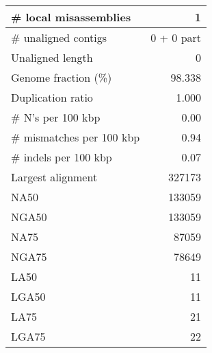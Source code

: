 \documentclass[12pt,a4paper]{article}
\begin{document}
\begin{table}[ht]
\begin{center}
\begin{tabular}{|l*{1}{|r}|}
\# local misassemblies & 1 \\ \hline
\# unaligned contigs & 0 + 0 part \\ \hline
Unaligned length & 0 \\ \hline
Genome fraction (\%) & 98.338 \\ \hline
Duplication ratio & 1.000 \\ \hline
\# N's per 100 kbp & 0.00 \\ \hline
\# mismatches per 100 kbp & 0.94 \\ \hline
\# indels per 100 kbp & 0.07 \\ \hline
Largest alignment & 327173 \\ \hline
NA50 & 133059 \\ \hline
NGA50 & 133059 \\ \hline
NA75 & 87059 \\ \hline
NGA75 & 78649 \\ \hline
LA50 & 11 \\ \hline
LGA50 & 11 \\ \hline
LA75 & 21 \\ \hline
LGA75 & 22 \\ \hline
\end{tabular}
\end{center}
\end{table}
\end{document}
